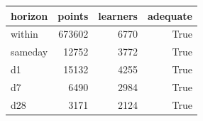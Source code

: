 \begin{tabular}{lrrr}
\toprule
horizon & points & learners & adequate \\
\midrule
within & 673602 & 6770 & True \\
sameday & 12752 & 3772 & True \\
d1 & 15132 & 4255 & True \\
d7 & 6490 & 2984 & True \\
d28 & 3171 & 2124 & True \\
\bottomrule
\end{tabular}
